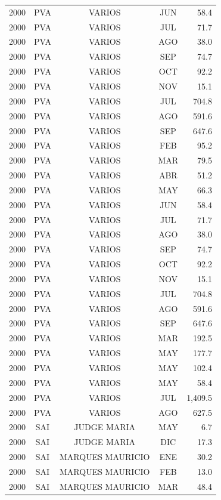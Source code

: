 \documentclass[12pt,]{article}
\begin{document}
\begin{table}[ht]
{\begin{tabular}{lcccr}
  2000 & PVA & VARIOS & JUN & 58.4 \\ 
  2000 & PVA & VARIOS & JUL & 71.7 \\ 
  2000 & PVA & VARIOS & AGO & 38.0 \\ 
  2000 & PVA & VARIOS & SEP & 74.7 \\ 
  2000 & PVA & VARIOS & OCT & 92.2 \\ 
  2000 & PVA & VARIOS & NOV & 15.1 \\ 
  2000 & PVA & VARIOS & JUL & 704.8 \\ 
  2000 & PVA & VARIOS & AGO & 591.6 \\ 
  2000 & PVA & VARIOS & SEP & 647.6 \\ 
  2000 & PVA & VARIOS & FEB & 95.2 \\ 
  2000 & PVA & VARIOS & MAR & 79.5 \\ 
  2000 & PVA & VARIOS & ABR & 51.2 \\ 
  2000 & PVA & VARIOS & MAY & 66.3 \\ 
  2000 & PVA & VARIOS & JUN & 58.4 \\ 
  2000 & PVA & VARIOS & JUL & 71.7 \\ 
  2000 & PVA & VARIOS & AGO & 38.0 \\ 
  2000 & PVA & VARIOS & SEP & 74.7 \\ 
  2000 & PVA & VARIOS & OCT & 92.2 \\ 
  2000 & PVA & VARIOS & NOV & 15.1 \\ 
  2000 & PVA & VARIOS & JUL & 704.8 \\ 
  2000 & PVA & VARIOS & AGO & 591.6 \\ 
  2000 & PVA & VARIOS & SEP & 647.6 \\ 
  2000 & PVA & VARIOS & MAR & 192.5 \\ 
  2000 & PVA & VARIOS & MAY & 177.7 \\ 
  2000 & PVA & VARIOS & MAY & 102.4 \\ 
  2000 & PVA & VARIOS & MAY & 58.4 \\ 
  2000 & PVA & VARIOS & JUL & 1,409.5 \\ 
  2000 & PVA & VARIOS & AGO & 627.5 \\ 
  2000 & SAI & JUDGE MARIA & MAY & 6.7 \\ 
  2000 & SAI & JUDGE MARIA & DIC & 17.3 \\ 
  2000 & SAI & MARQUES MAURICIO & ENE & 30.2 \\ 
  2000 & SAI & MARQUES MAURICIO & FEB & 13.0 \\ 
  2000 & SAI & MARQUES MAURICIO & MAR & 48.4 \\ 

\end{tabular}}
\end{table}
\end{document}
